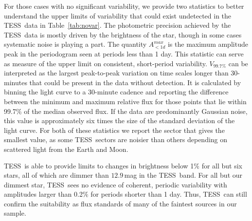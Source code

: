 \documentclass[twocolumn, linenumbers]{aastex631}
\newcommand{\tess}{TESS}
\begin{document}
For those cases with no significant variability, we provide two statistics to better understand the upper limits of variability that could exist undetected in the \tess\ data in Table~\ref{tab:novar}. The photometric precision achieved by the \tess\ data is mostly driven by the brightness of the star, though in some cases systematic noise is playing a part. The quantity $A^{max}_{<1d}$ is the maximum amplitude peak in the periodogram seen at periods less than 1 day. This statistic can serve as measure of the upper limit on consistent, short-period variability. $V_{99.7\%}$ can be interpreted as the largest peak-to-peak variation on time scales longer than 30-minutes that could be present in the data without detection. It is calculated by binning the light curve to a 30-minute cadence and reporting the difference between the minimum and maximum relative flux for those points that lie within 99.7\% of the median observed flux. If the data are predominantly Gaussian noise, this value is approximately six times the size of the standard deviation of the light curve. For both of these statistics we report the sector that gives the smallest value, as some \tess\ sectors are noisier than others depending on scattered light from the Earth and Moon. 

\tess\ is able to provide limits to changes in brightness below 1\% for all but six stars, all of which are dimmer than $12.9$\,mag in the \tess\ band.  For all but our dimmest star, \tess\ sees no evidence of coherent, periodic variability with amplitudes larger than 0.2\% for periods shorter than 1 day. Thus, \tess\ can still confirm the suitability as flux standards of many of the faintest sources in our sample.


\vspace{-1em}
\end{document}
